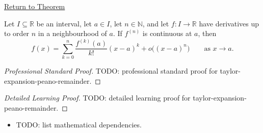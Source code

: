 \newpage
{}
\label{prf:taylor-expansion-peano-remainder}

\begin{remark*}[Return]
\hyperref[cor:taylor-expansion-peano-remainder]{Return to Theorem}
\end{remark*}

\begin{theorem*}
Let $I\subseteq\mathbb{R}$ be an interval, let $a\in I$, let
$n\in\mathbb{N}$, and let $f:I\to\mathbb{R}$ have derivatives up to order
$n$ in a neighbourhood of $a$. If $f^{(n)}$ is continuous at $a$, then
\[
  f(x)
  =
  \sum_{k=0}^{n}\frac{f^{(k)}(a)}{k!}(x-a)^k
  +
  o\bigl((x-a)^n\bigr)
  \qquad\text{as }x\to a.
\]

\smallskip
\noindent
\end{theorem*}

\begin{proof}[Professional Standard Proof]
\LRAProofBodyStart
TODO: professional standard proof for taylor-expansion-peano-remainder.
\end{proof}

\begin{proof}[Detailed Learning Proof]
\LRAProofBodyStart
TODO: detailed learning proof for taylor-expansion-peano-remainder.
\end{proof}

\begin{remark*}
\end{remark*}

\begin{dependencies}
\begin{itemize}
  \item TODO: list mathematical dependencies.
\end{itemize}
\end{dependencies}

\clearpage
